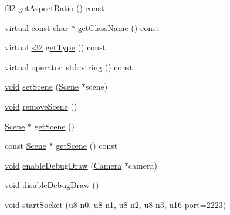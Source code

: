 \begin{DoxyCompactItemize}
\item 
\mbox{\hyperlink{_util_8h_a5f6906312a689f27d70e9d086649d3fd}{f32}} \mbox{\hyperlink{classnjli_1_1_world_a4f3d49c5cc8e3a3a2c2439e663a9c60b}{get\+Aspect\+Ratio}} () const
\item 
virtual const char $\ast$ \mbox{\hyperlink{classnjli_1_1_world_a2811263a084944cded212cd714a165cf}{get\+Class\+Name}} () const
\item 
virtual \mbox{\hyperlink{_util_8h_aa62c75d314a0d1f37f79c4b73b2292e2}{s32}} \mbox{\hyperlink{classnjli_1_1_world_a35e88a33b35fa6de44f10e3a93a62468}{get\+Type}} () const
\item 
virtual \mbox{\hyperlink{classnjli_1_1_world_a2a892d17f7e21b51784e45ecc4aa642e}{operator std\+::string}} () const
\item 
\mbox{\hyperlink{_thread_8h_af1e856da2e658414cb2456cb6f7ebc66}{void}} \mbox{\hyperlink{classnjli_1_1_world_a80c42c94ab3fbf4242f3d9b5e7866379}{set\+Scene}} (\mbox{\hyperlink{classnjli_1_1_scene}{Scene}} $\ast$scene)
\item 
\mbox{\hyperlink{_thread_8h_af1e856da2e658414cb2456cb6f7ebc66}{void}} \mbox{\hyperlink{classnjli_1_1_world_aabf2a07e2fab640f5800357ad1fd7717}{remove\+Scene}} ()
\item 
\mbox{\hyperlink{classnjli_1_1_scene}{Scene}} $\ast$ \mbox{\hyperlink{classnjli_1_1_world_aacef8d7932cbc6df28524a15b30b50f5}{get\+Scene}} ()
\item 
const \mbox{\hyperlink{classnjli_1_1_scene}{Scene}} $\ast$ \mbox{\hyperlink{classnjli_1_1_world_a007a67243897e4dd1448e97b6b860389}{get\+Scene}} () const
\item 
\mbox{\hyperlink{_thread_8h_af1e856da2e658414cb2456cb6f7ebc66}{void}} \mbox{\hyperlink{classnjli_1_1_world_ad67785776209cbbaa6140fcc90b4913a}{enable\+Debug\+Draw}} (\mbox{\hyperlink{classnjli_1_1_camera}{Camera}} $\ast$camera)
\item 
\mbox{\hyperlink{_thread_8h_af1e856da2e658414cb2456cb6f7ebc66}{void}} \mbox{\hyperlink{classnjli_1_1_world_a4894e4a53f692a503661a7836bf7713f}{disable\+Debug\+Draw}} ()
\item 
\mbox{\hyperlink{_thread_8h_af1e856da2e658414cb2456cb6f7ebc66}{void}} \mbox{\hyperlink{classnjli_1_1_world_a5b67da9acd56cec605ad0dccc2b957cd}{start\+Socket}} (\mbox{\hyperlink{_util_8h_aed742c436da53c1080638ce6ef7d13de}{u8}} n0, \mbox{\hyperlink{_util_8h_aed742c436da53c1080638ce6ef7d13de}{u8}} n1, \mbox{\hyperlink{_util_8h_aed742c436da53c1080638ce6ef7d13de}{u8}} n2, \mbox{\hyperlink{_util_8h_aed742c436da53c1080638ce6ef7d13de}{u8}} n3, \mbox{\hyperlink{_util_8h_a9e6c91d77e24643b888dbd1a1a590054}{u16}} port=2223)

\end{DoxyCompactItemize}
